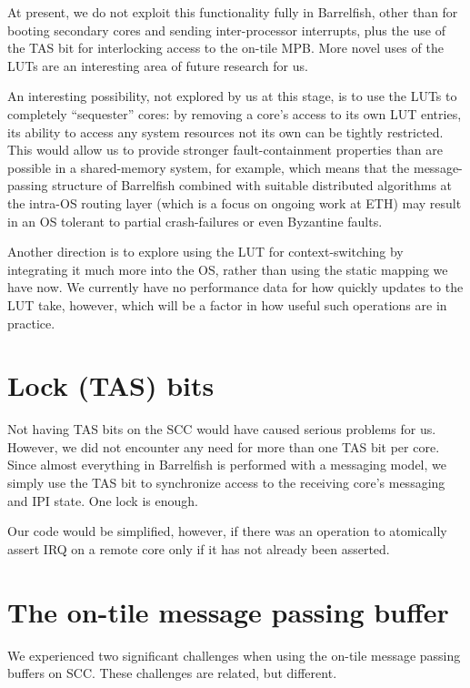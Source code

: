 \documentclass[a4paper,twoside]{report} %
\begin{document}
At present, we do not exploit this functionality fully in Barrelfish,
other than for booting secondary cores and sending inter-processor
interrupts, plus the use of the TAS bit for interlocking access to the
on-tile MPB.   More novel uses of the LUTs are an interesting area of
future research for us. 

An interesting possibility, not explored by us at this stage, is to
use the LUTs to completely ``sequester'' cores: by removing a core's
access to its own LUT entries, its ability to access any system
resources not its own can be tightly restricted.  This would allow us
to provide stronger fault-containment properties than are possible in
a shared-memory system, for example, which means that the
message-passing structure of Barrelfish combined with suitable
distributed algorithms at the intra-OS routing layer (which is a focus
on ongoing work at ETH) may result in an OS tolerant to partial
crash-failures or even Byzantine faults. 

Another direction is to explore using the LUT for context-switching by
integrating it much more into the OS, rather than using the static
mapping we have now.  We currently have no performance data for how
quickly updates to the LUT take, however, which will be a factor in
how useful such operations are in practice.

\section{Lock (TAS) bits}

Not having TAS bits on the SCC would have caused serious problems
for us.  However, we did not encounter any need for more than one
TAS bit per core.  Since almost everything in Barrelfish is performed
with a messaging model, we simply use the TAS bit to synchronize
access to the receiving core's messaging and IPI state.  One lock is
enough.  

Our code would be simplified, however, if there was an operation to
atomically assert IRQ on a remote core only if it has not already been
asserted.

\section{The on-tile message passing buffer}

We experienced two significant challenges when using the on-tile
message passing buffers on SCC.  These challenges are related, but
different. 
\end{document}

